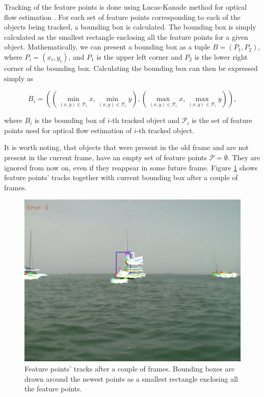 \documentclass[10pt,twocolumn,letterpaper]{article}
\begin{document}
Tracking of the feature points is done using Lucas-Kanade method for optical flow
estimation \cite{lucas-kanade}. For each set of feature points corresponding to
each of the objects being tracked, a bounding box is calculated. The bounding box is
simply calculated as the smallest rectangle enclosing all the feature points for a
given object. Mathematically, we can present a bounding box as a tuple $B = (P_1, P_2)$,
where $P_i = (x_i, y_i)$, and $P_1$ is the upper left corner and $P_2$ is the lower
right corner of the bounding box. Calculating the bounding box can then be expressed simply as

\begin{equation}
   B_i = \left( \left(\min_{(x,y) \in \mathcal{P}_i} x, \min_{(x,y) \in \mathcal{P}_i} y\right), \left(\max_{(x,y) \in \mathcal{P}_i} x, \max_{(x,y) \in \mathcal{P}_i} y\right) \right),
\end{equation}

where $B_i$ is the bounding box of $i$-th tracked object and $\mathcal{P}_i$ is the
set of feature points used for optical flow estimation of $i$-th tracked object.

It is worth noting, that objects that were present in the old frame and are not present
in the current frame, have an empty set of feature points $\mathcal{P} = \emptyset$.
They are ignored from now on, even if they reappear in some future frame. Figure
\ref{fig:sofot_track} shows feature points' tracks together with current bounding box after a couple of frames.

\begin{figure}
   \centering
   \includegraphics[width=\linewidth]{images/screen_of.png}
   \caption{Feature points' tracks after a couple of frames. Bounding boxes are drawn
   around the newest points as a smallest rectangle enclosing all the feature points.}
   \label{fig:sofot_track}
\end{figure}
\end{document}
